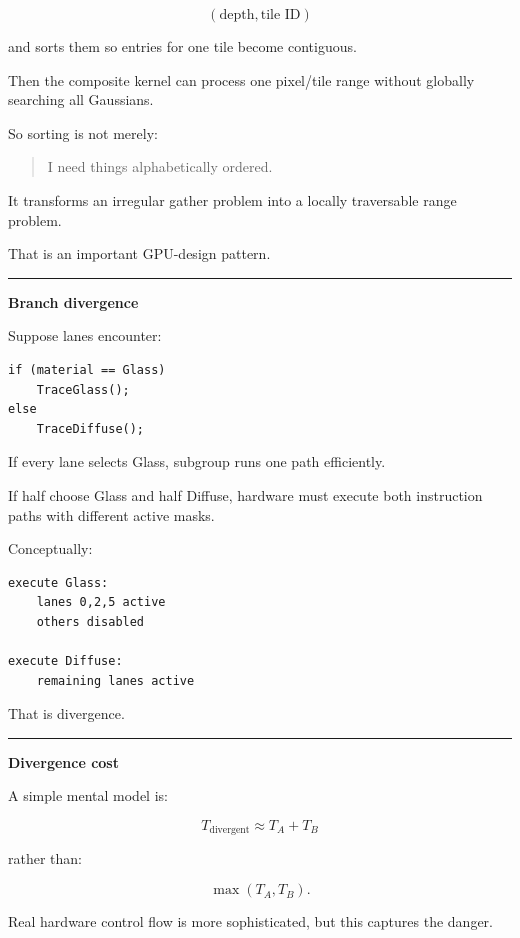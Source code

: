 \[
(\text{depth},\text{tile ID})
\]

and sorts them so entries for one tile become contiguous.

Then the composite kernel can process one pixel/tile range without globally searching all Gaussians.

So sorting is not merely:

\begin{quote}
I need things alphabetically ordered.
\end{quote}

It transforms an irregular gather problem into a locally traversable range problem.

That is an important GPU-design pattern.

\begin{center}\rule{0.5\linewidth}{0.5pt}\end{center}

\textbf{Branch divergence}

Suppose lanes encounter:

\protect{}\label{86rlbx}%
\begin{verbatim}
if (material == Glass)
    TraceGlass();
else
    TraceDiffuse();
\end{verbatim}

If every lane selects Glass, subgroup runs one path efficiently.

If half choose Glass and half Diffuse, hardware must execute both instruction paths with different active masks.

Conceptually:

\protect{}\label{c7d0fn}%
\begin{verbatim}
execute Glass:
    lanes 0,2,5 active
    others disabled

execute Diffuse:
    remaining lanes active
\end{verbatim}

That is divergence.

\begin{center}\rule{0.5\linewidth}{0.5pt}\end{center}

\textbf{Divergence cost}

A simple mental model is:

\[
T_{\text{divergent}}
\approx
T_A+T_B
\]

rather than:

\[
\max(T_A,T_B).
\]

Real hardware control flow is more sophisticated, but this captures the danger.

